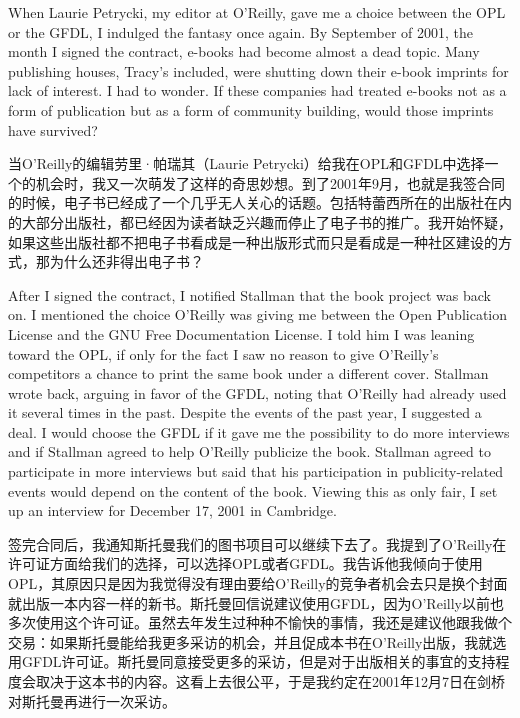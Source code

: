\ifdefined\eng
When Laurie Petrycki, my editor at O'Reilly, gave me a choice between the OPL or the GFDL, I indulged the fantasy once again. By September of 2001, the month I signed the contract, e-books had become almost a dead topic. Many publishing houses, Tracy's included, were shutting down their e-book imprints for lack of interest. I had to wonder. If these companies had treated e-books not as a form of publication but as a form of community building, would those imprints have survived?
\fi

\ifdefined\chs
当O'Reilly的编辑劳里·帕瑞其（Laurie Petrycki）给我在OPL和GFDL中选择一个的机会时，我又一次萌发了这样的奇思妙想。到了2001年9月，也就是我签合同的时候，电子书已经成了一个几乎无人关心的话题。包括特蕾西所在的出版社在内的大部分出版社，都已经因为读者缺乏兴趣而停止了电子书的推广。我开始怀疑，如果这些出版社都不把电子书看成是一种出版形式而只是看成是一种社区建设的方式，那为什么还非得出电子书？
\fi

\ifdefined\eng
After I signed the contract, I notified Stallman that the book project was back on. I mentioned the choice O'Reilly was giving me between the Open Publication License and the GNU Free Documentation License. I told him I was leaning toward the OPL, if only for the fact I saw no reason to give O'Reilly's competitors a chance to print the same book under a different cover. Stallman wrote back, arguing in favor of the GFDL, noting that O'Reilly had already used it several times in the past. Despite the events of the past year, I suggested a deal. I would choose the GFDL if it gave me the possibility to do more interviews and if Stallman agreed to help O'Reilly publicize the book. Stallman agreed to participate in more interviews but said that his participation in publicity-related events would depend on the content of the book. Viewing this as only fair, I set up an interview for December 17, 2001 in Cambridge.
\fi

\ifdefined\chs
签完合同后，我通知斯托曼我们的图书项目可以继续下去了。我提到了O'Reilly在许可证方面给我们的选择，可以选择OPL或者GFDL。我告诉他我倾向于使用OPL，其原因只是因为我觉得没有理由要给O'Reilly的竞争者机会去只是换个封面就出版一本内容一样的新书。斯托曼回信说建议使用GFDL，因为O'Reilly以前也多次使用这个许可证。虽然去年发生过种种不愉快的事情，我还是建议他跟我做个交易：如果斯托曼能给我更多采访的机会，并且促成本书在O'Reilly出版，我就选用GFDL许可证。斯托曼同意接受更多的采访，但是对于出版相关的事宜的支持程度会取决于这本书的内容。这看上去很公平，于是我约定在2001年12月7日在剑桥对斯托曼再进行一次采访。
\fi

